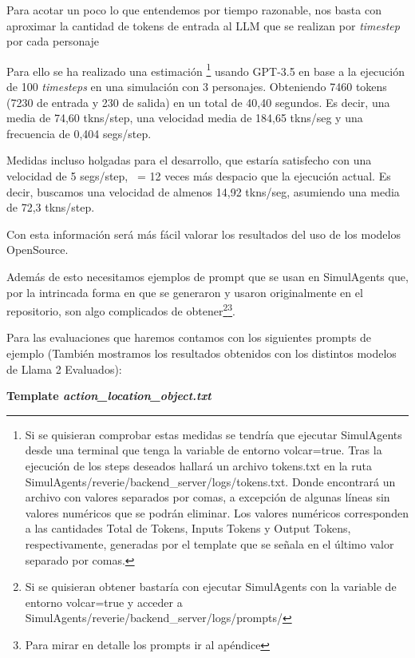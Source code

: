 Para acotar un poco lo que entendemos por tiempo razonable, nos basta con aproximar la cantidad de tokens de entrada al LLM que se realizan por \textit{timestep} por cada personaje

Para ello se ha realizado una estimación \footnote{Si se quisieran comprobar estas medidas se tendría que ejecutar SimulAgents desde una terminal que tenga la variable de entorno volcar=true. Tras la ejecución de los steps deseados hallará un archivo tokens.txt en la ruta SimulAgents/reverie/backend\_server/logs/tokens.txt. Donde encontrará un archivo con valores separados por comas, a excepción de algunas líneas sin valores numéricos que se podrán eliminar. Los valores numéricos corresponden a las cantidades Total de Tokens, Inputs Tokens y Output Tokens, respectivamente, generadas por el template que se señala en el último valor separado por comas.} usando GPT-3.5 en base a la ejecución de 100 \textit{timesteps} en una simulación con 3 personajes. Obteniendo 7460 tokens (7230 de entrada y 230 de salida) en un total de 40,40 segundos. Es decir, una media de 74,60 tkns/step, una velocidad media de 184,65 tkns/seg y una frecuencia de 0,404 segs/step.

Medidas incluso holgadas para el desarrollo, que estaría satisfecho con una velocidad de 5 segs/step, ~= 12 veces más despacio que la ejecución actual. Es decir, buscamos una velocidad de almenos 14,92 tkns/seg, asumiendo una media de 72,3 tkns/step.

Con esta información será más fácil valorar los resultados del uso de los modelos OpenSource.

Además de esto necesitamos ejemplos de prompt que se usan en SimulAgents que, por la intrincada forma en que se generaron y usaron originalmente en el repositorio, son algo complicados de obtener\footnote{Si se quisieran obtener bastaría con ejecutar SimulAgents con la variable de entorno volcar=true y acceder a SimulAgents/reverie/backend\_server/logs/prompts/}\footnote{Para mirar en detalle los prompts ir al apéndice}.

Para las evaluaciones que haremos contamos con los siguientes prompts de ejemplo (También mostramos los resultados obtenidos con los distintos modelos de Llama 2 Evaluados):

\textbf{Template \textit{action\_location\_object.txt}}
\label{template:action_location_object.txt}

